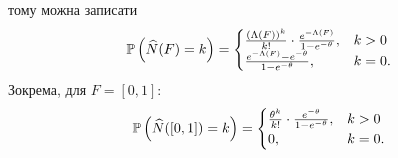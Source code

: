 тому можна записати
\begin{gather}
    \P{\widehat{N} (F) = k} =
    \begin{cases}
        \frac{(\Lambda(F))^k}{k!} \cdot \frac{e^{-\Lambda(F)}}{1 - e^{-\theta}}, & k > 0 \\
        \frac{e^{-\Lambda(F)} - e^{-\theta}}{1 - e^{-\theta}}, & k = 0.
    \end{cases}
\end{gather}
Зокрема, для $F = [0, 1]$:
\begin{gather}
    \P{\widehat{N} ([0, 1]) = k} = 
    \begin{cases}
        \frac{\theta^k}{k!} \cdot \frac{e^{-\theta}}{1 - e^{-\theta}}, & k > 0 \\
        0, & k = 0.
    \end{cases}
\end{gather}

